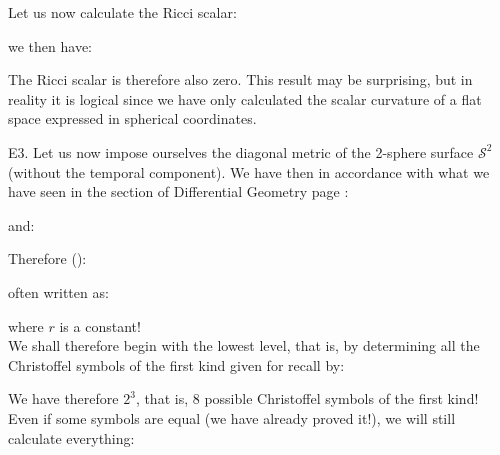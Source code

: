 	\begin{tcolorbox}[colframe=black,colback=white,sharp corners]
	
	\end{tcolorbox}
	
	\begin{tcolorbox}[colframe=black,colback=white,sharp corners]
	
	\end{tcolorbox}
	
	\begin{tcolorbox}[colframe=black,colback=white,sharp corners]
	
	\end{tcolorbox}
	
	\begin{tcolorbox}[colframe=black,colback=white,sharp corners]
	
	Let us now calculate the Ricci scalar:
	
	we then have:
	
	The Ricci scalar is therefore also zero. This result may be surprising, but in reality it is logical since we have only calculated the scalar curvature of a flat space expressed in spherical coordinates.
	\end{tcolorbox}
	
	\begin{tcolorbox}[colframe=black,colback=white,sharp corners]
	E3. \label{Christoffel symbol 2-sphere}Let us now impose ourselves the diagonal metric of the 2-sphere surface $\mathcal{S}^2$ (without the temporal component). We have then in accordance with what we have seen in the section of Differential Geometry page \pageref{metric two sphere}:
	
	and:
	
	Therefore ():
	
	often written as:
	
	where $r$ is a constant!\\

	We shall therefore begin with the lowest level, that is, by determining all the Christoffel symbols of the first kind given for recall by:
	
	We have therefore $2^3$, that is, $8$ possible Christoffel symbols of the first kind! Even if some symbols are equal (we have already proved it!), we will still calculate everything:
	
	\end{tcolorbox}
	
